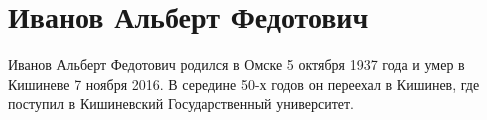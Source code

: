 \section{Иванов Альберт Федотович}

Иванов Альберт Федотович родился в Омске 5 октября 1937 года и умер в Кишиневе 
7 ноября 2016. В середине 50-х годов он переехал в Кишинев, где поступил в 
Кишиневский Государственный университет.

\clearpage